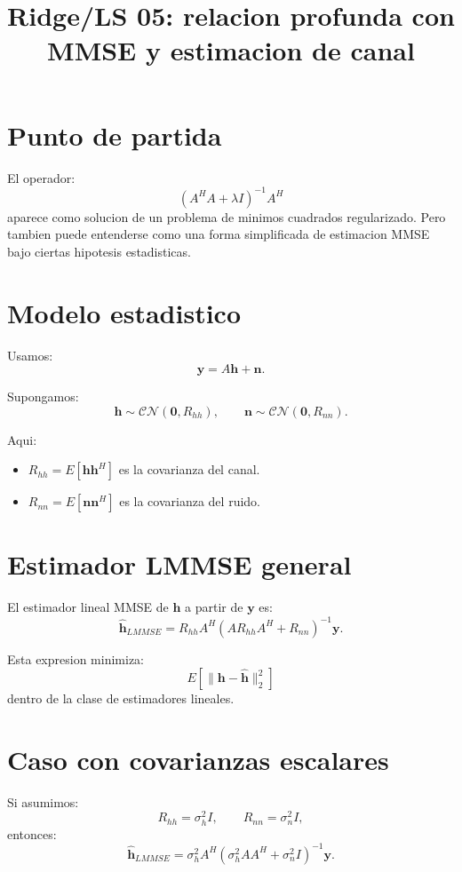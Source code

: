 \documentclass[11pt]{article}
\title{Ridge/LS 05: relacion profunda con MMSE y estimacion de canal}
\author{}
\date{}
\begin{document}
\maketitle

\section{Punto de partida}

El operador:
\[
    (A^H A+\lambda I)^{-1}A^H
\]
aparece como solucion de un problema de minimos cuadrados regularizado. Pero
tambien puede entenderse como una forma simplificada de estimacion MMSE bajo
ciertas hipotesis estadisticas.

\section{Modelo estadistico}

Usamos:
\[
    \bm y = A\bm h + \bm n.
\]

Supongamos:
\[
    \bm h \sim \mathcal{CN}(\bm 0, R_{hh}),
    \qquad
    \bm n \sim \mathcal{CN}(\bm 0, R_{nn}).
\]

Aqui:

\begin{itemize}
    \item \(R_{hh}=E[\bm h\bm h^H]\) es la covarianza del canal.
    \item \(R_{nn}=E[\bm n\bm n^H]\) es la covarianza del ruido.
\end{itemize}

\section{Estimador LMMSE general}

El estimador lineal MMSE de \(\bm h\) a partir de \(\bm y\) es:
\[
    \hat{\bm h}_{LMMSE}
    =
    R_{hh}A^H
    \left(
        A R_{hh} A^H + R_{nn}
    \right)^{-1}
    \bm y.
\]

Esta expresion minimiza:
\[
    E\left[\|\bm h-\hat{\bm h}\|_2^2\right]
\]
dentro de la clase de estimadores lineales.

\section{Caso con covarianzas escalares}

Si asumimos:
\[
    R_{hh} = \sigma_h^2 I,
    \qquad
    R_{nn} = \sigma_n^2 I,
\]
entonces:
\[
    \hat{\bm h}_{LMMSE}
    =
    \sigma_h^2 A^H
    \left(
        \sigma_h^2 A A^H + \sigma_n^2 I
    \right)^{-1}
    \bm y.
\]
\end{document}
